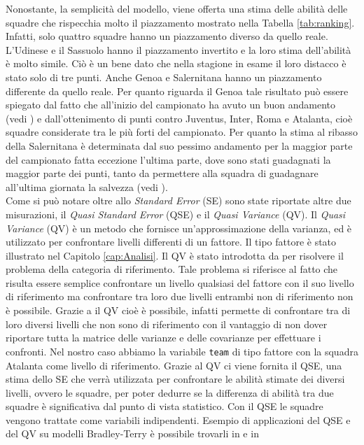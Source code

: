 Nonostante, la semplicità del modello, viene offerta una stima delle abilità delle squadre che rispecchia molto il piazzamento mostrato nella Tabella \ref{tab:ranking}. Infatti, solo quattro squadre hanno un piazzamento diverso da quello reale. L'Udinese e il Sassuolo hanno il piazzamento invertito e la loro stima dell'abilità è molto simile. Ciò è un bene dato che nella stagione in esame il loro distacco è stato solo di tre punti. Anche Genoa e Salernitana hanno un piazzamento differente da quello reale. Per quanto riguarda il Genoa tale risultato può essere spiegato dal fatto che all'inizio del campionato ha avuto un buon andamento (vedi \textit{\cite{site:storyGenoa}}) e dall'ottenimento di punti contro Juventus, Inter, Roma e Atalanta, cioè squadre considerate tra le più forti del campionato. Per quanto la stima al ribasso della Salernitana è determinata dal suo pessimo andamento per la maggior parte del campionato fatta eccezione l'ultima parte, dove sono stati guadagnati la maggior parte dei punti, tanto da permettere alla squadra di guadagnare all'ultima giornata la salvezza (vedi \textit{\cite{site:storySal}}). \\
Come si può notare oltre allo \emph{Standard Error} (SE) sono state riportate altre due misurazioni, il \emph{Quasi Standard Error} (QSE) \autocite{firth2004quasi} e il \emph{Quasi Variance} (QV)\autocite{firth2004quasi}. Il \emph{Quasi Variance} (QV)\autocite{firth2004quasi} è un metodo che fornisce un'approssimazione della varianza, ed è utilizzato per confrontare livelli differenti di un fattore. Il tipo fattore è stato illustrato nel Capitolo \ref{cap:Analisi}. Il QV è stato introdotta da \autocite{firth2004quasi} per risolvere il problema della categoria di riferimento. Tale problema si riferisce al fatto che risulta essere semplice confrontare un livello qualsiasi del fattore con il suo livello di riferimento ma confrontare tra loro due livelli entrambi non di riferimento non è possibile. Grazie a il QV cioè è possibile, infatti permette di confrontare tra di loro diversi livelli che non sono di riferimento con il vantaggio di non dover riportare tutta la matrice delle varianze e delle covarianze per effettuare i confronti. Nel nostro caso abbiamo la variabile \texttt{team} di tipo fattore con la squadra Atalanta come livello di riferimento. Grazie al QV ci viene fornita il QSE, una stima dello SE che verrà utilizzata per confrontare le abilità stimate dei diversi livelli, ovvero le squadre, per poter dedurre se la differenza di abilità tra due squadre è significativa dal punto di vista statistico. Con il QSE le squadre vengono trattate come variabili indipendenti. Esempio di applicazioni del QSE e del QV su modelli Bradley-Terry è possibile trovarli in \textcite{firth2004quasi} e in \textcite{turner2012bradley}
